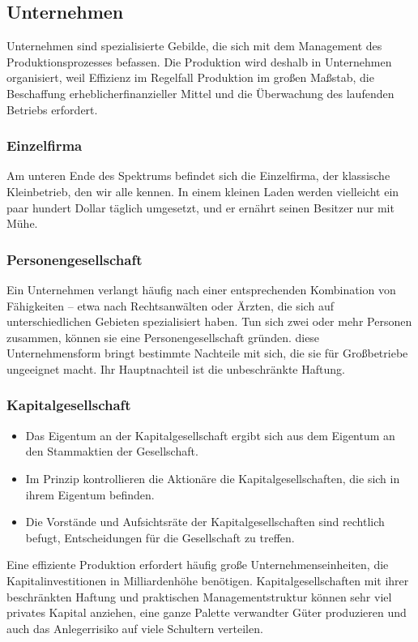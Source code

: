 \documentclass[10pt]{scrartcl}
\begin{document}
\subsection{Unternehmen}
Unternehmen sind spezialisierte Gebilde, die sich mit dem Management des Produktionsprozesses befassen. Die Produktion wird deshalb in Unternehmen organisiert, weil Effizienz im Regelfall Produktion im großen Maßstab, die Beschaffung erheblicherfinanzieller Mittel und die Überwachung des laufenden Betriebs erfordert.
\subsubsection{Einzelfirma}
Am unteren Ende des Spektrums befindet sich die Einzelfirma, der klassische Kleinbetrieb, den wir alle kennen. In einem kleinen Laden werden vielleicht ein paar hundert Dollar täglich umgesetzt, und er ernährt seinen Besitzer nur mit Mühe.
\subsubsection{Personengesellschaft}
Ein Unternehmen verlangt häufig nach einer entsprechenden Kombination von Fähigkeiten – etwa nach Rechtsanwälten oder Ärzten, die sich auf unterschiedlichen Gebieten spezialisiert haben. Tun sich zwei oder mehr Personen zusammen, können sie eine Personengesellschaft gründen. diese Unternehmensform bringt bestimmte Nachteile mit sich, die sie für Großbetriebe ungeeignet macht. Ihr Hauptnachteil ist die unbeschränkte Haftung.
\subsubsection{Kapitalgesellschaft}
\begin{itemize}
\item Das Eigentum an der Kapitalgesellschaft ergibt sich aus dem Eigentum an den Stammaktien der Gesellschaft.
\item Im Prinzip kontrollieren die Aktionäre die Kapitalgesellschaften, die sich in ihrem Eigentum befinden.
\item Die Vorstände und Aufsichtsräte der Kapitalgesellschaften sind rechtlich befugt, Entscheidungen für die Gesellschaft zu treffen.
\end{itemize}
Eine effiziente Produktion erfordert häufig große Unternehmenseinheiten, die Kapitalinvestitionen in Milliardenhöhe benötigen. Kapitalgesellschaften mit ihrer beschränkten Haftung und praktischen Managementstruktur können sehr viel privates Kapital anziehen, eine ganze Palette verwandter Güter produzieren und auch das Anlegerrisiko auf viele Schultern verteilen. 
\end{document}
